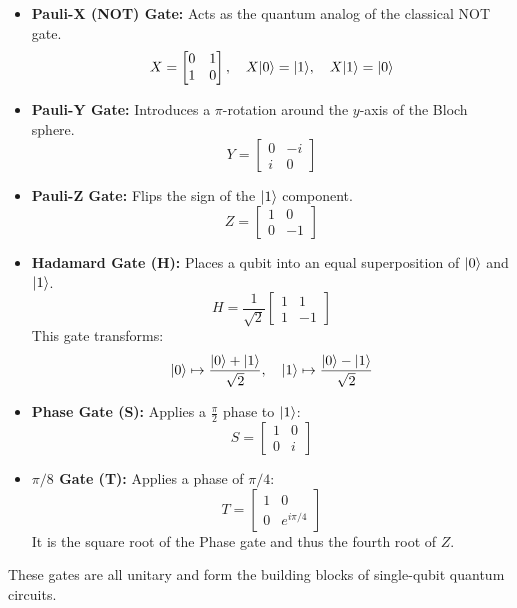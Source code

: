 \documentclass[12pt]{report}
\begin{document}
\begin{itemize}
  \item \textbf{Pauli-X (NOT) Gate:} Acts as the quantum analog of the classical NOT gate.
  \[
  X = \begin{bmatrix} 0 & 1 \\ 1 & 0 \end{bmatrix}, \quad X \lvert0\rangle = \lvert1\rangle, \quad X \lvert1\rangle = \lvert0\rangle
  \]
  
  \item \textbf{Pauli-Y Gate:} Introduces a $\pi$-rotation around the $y$-axis of the Bloch sphere.
  \[
  Y = \begin{bmatrix} 0 & -i \\ i & 0 \end{bmatrix}
  \]

  \item \textbf{Pauli-Z Gate:} Flips the sign of the $\lvert1\rangle$ component.
  \[
  Z = \begin{bmatrix} 1 & 0 \\ 0 & -1 \end{bmatrix}
  \]

  \item \textbf{Hadamard Gate (H):} Places a qubit into an equal superposition of $\lvert0\rangle$ and $\lvert1\rangle$.
  \[
  H = \frac{1}{\sqrt{2}} \begin{bmatrix} 1 & 1 \\ 1 & -1 \end{bmatrix}
  \]
  This gate transforms:
  \[
  \lvert0\rangle \mapsto \frac{\lvert0\rangle + \lvert1\rangle}{\sqrt{2}}, \quad \lvert1\rangle \mapsto \frac{\lvert0\rangle - \lvert1\rangle}{\sqrt{2}}
  \]

  \item \textbf{Phase Gate (S):} Applies a $\frac{\pi}{2}$ phase to $\lvert1\rangle$:
  \[
  S = \begin{bmatrix} 1 & 0 \\ 0 & i \end{bmatrix}
  \]

  \item \textbf{$\pi/8$ Gate (T):} Applies a phase of $\pi/4$:
  \[
  T = \begin{bmatrix} 1 & 0 \\ 0 & e^{i\pi/4} \end{bmatrix}
  \]
  It is the square root of the Phase gate and thus the fourth root of $Z$.
\end{itemize}

These gates are all unitary and form the building blocks of single-qubit quantum circuits.
\end{document}
